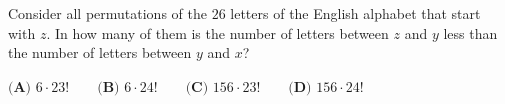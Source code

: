 Consider all permutations of the $26$ letters of the English alphabet that start with $z$. In how many of them is the number of letters between $z$ and $y$ less than the number of letters between $y$ and $x$?

$\textbf{(A) }6\cdot23!\qquad\textbf{(B) }6\cdot24!\qquad\textbf{(C) }156\cdot23!\qquad\textbf{(D) }156\cdot24!$
